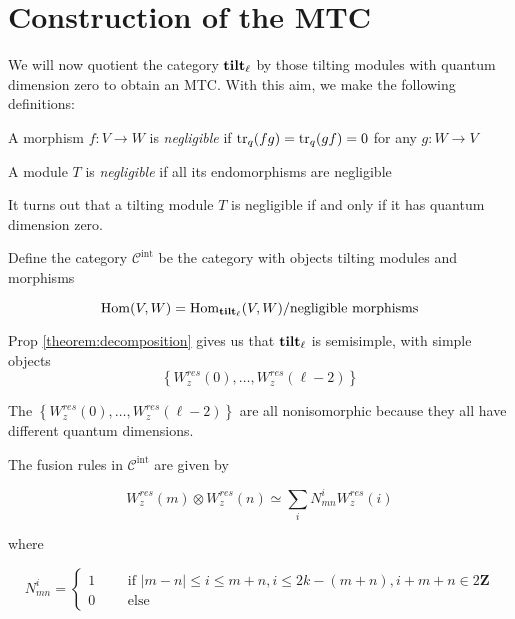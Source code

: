 \section{Construction of the MTC}
\label{MTC-construction}

We will now quotient the category $\mathbf{tilt}_\ell$ by those tilting modules with quantum
dimension zero to obtain an MTC. With this aim, we make the following
definitions:

\begin{defn}
    A morphism $f: V \to W$ is \emph{negligible} if $\operatorname{tr}_q(fg) = \operatorname{tr}_q(gf) = 0$ for any $g: W \to V$
\end{defn}

\begin{defn}
A module $T$ is \emph{negligible} if all its endomorphisms are negligible
\end{defn}

It turns out that a tilting module $T$ is negligible if and only if it has
quantum dimension zero. 

Define the category $\mathcal{C}^\text{int}$ be the category with objects tilting modules and morphisms 

    \begin{equation}
        \operatorname{Hom}(V,W) = \operatorname{Hom}_{\mathbf{tilt}_\ell}(V,W) / \text{negligible morphisms}
    \end{equation}

Prop \ref{theorem:decomposition} gives us that $\mathbf{tilt}_\ell$ is semisimple,
with simple objects 
\begin{equation}
\left\{ W_z^{res}(0), \ldots, W_z^{res}(\ell-2) \right\}
\end{equation}

The $\left\{ W_z^{res}(0), \ldots, W_z^{res}(\ell-2) \right\}$ are all
nonisomorphic because they all have different quantum dimensions.

The fusion rules in $\mathcal{C}^{\text{int}}$ are given by

\begin{equation}
    W_z^{res}(m) \otimes W_z^{res}(n) \simeq \sum_i N_{mn}^i W_z^{res}(i)
\end{equation}

where 

\begin{equation}
    N_{mn}^i = \begin{cases} 1 \qquad \text{ if } |m-n| \leq i \leq m+n, i \leq 2k - (m+n), i + m + n \in 2 \mathbf{Z} \\
                             0 \qquad \text{ else } 
               \end{cases}
\end{equation}

